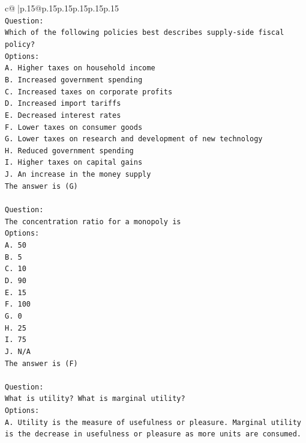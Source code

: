 \documentclass{article}
\begin{document}
{\begin{supertabular}{c@{$\;$}|p{.15\linewidth}@{}p{.15\linewidth}p{.15\linewidth}p{.15\linewidth}p{.15\linewidth}p{.15\linewidth}}
{{{\\ 
\texttt{Question:} \\
\texttt{Which of the following policies best describes supply{-}side fiscal policy?} \\
\texttt{Options:} \\
\texttt{A. Higher taxes on household income} \\
\texttt{B. Increased government spending} \\
\texttt{C. Increased taxes on corporate profits} \\
\texttt{D. Increased import tariffs} \\
\texttt{E. Decreased interest rates} \\
\texttt{F. Lower taxes on consumer goods} \\
\texttt{G. Lower taxes on research and development of new technology} \\
\texttt{H. Reduced government spending} \\
\texttt{I. Higher taxes on capital gains} \\
\texttt{J. An increase in the money supply} \\
\texttt{The answer is (G)} \\
\\ 
\texttt{Question:} \\
\texttt{The concentration ratio for a monopoly is} \\
\texttt{Options:} \\
\texttt{A. 50} \\
\texttt{B. 5} \\
\texttt{C. 10} \\
\texttt{D. 90} \\
\texttt{E. 15} \\
\texttt{F. 100} \\
\texttt{G. 0} \\
\texttt{H. 25} \\
\texttt{I. 75} \\
\texttt{J. N/A} \\
\texttt{The answer is (F)} \\
\\ 
\texttt{Question:} \\
\texttt{What is utility? What is marginal utility?} \\
\texttt{Options:} \\
\texttt{A. Utility is the measure of usefulness or pleasure. Marginal utility is the decrease in usefulness or pleasure as more units are consumed.} \\
}}}
\end{supertabular}}
\end{document}
